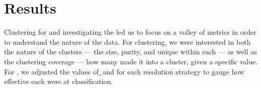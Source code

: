 \chapter{Results}\label{chap:results}
Clustering for \bslong{} and investigating the \krap{} led us to focus on a volley of metrics in order to understand the nature of the data.
For clustering, we were interested in both the nature of the clusters --- the size, purity, and unique \spec{} within each --- as well as the clustering coverage --- how many \cplop{} \isols{} made it into a cluster, given a specific \minneigh{} value.
For \krap{}, we adjusted the values of \k{} and \a{} for each resolution strategy to gauge how effective each were at classification.


